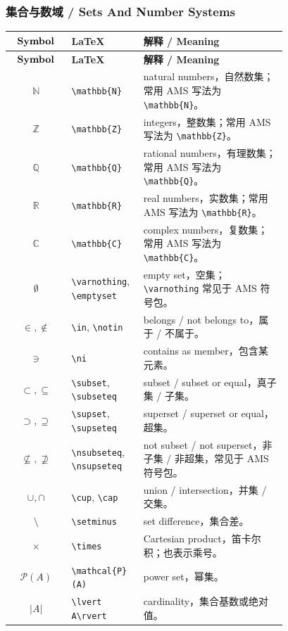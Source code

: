 \documentclass[11pt]{article}
\begin{document}
\subsubsection{集合与数域 / Sets And Number Systems}

\begin{longtable}{>{$}c<{$} p{0.26\linewidth} p{0.52\linewidth}}
\hline
\text{\textbf{Symbol}} & \textbf{LaTeX} & \textbf{解释 / Meaning} \\
\hline
\endfirsthead
\hline
\text{\textbf{Symbol}} & \textbf{LaTeX} & \textbf{解释 / Meaning} \\
\hline
\endhead
ℕ & \verb|\mathbb{N}| & natural numbers，自然数集；常用 AMS 写法为 \verb|\mathbb{N}|。 \\
ℤ & \verb|\mathbb{Z}| & integers，整数集；常用 AMS 写法为 \verb|\mathbb{Z}|。 \\
ℚ & \verb|\mathbb{Q}| & rational numbers，有理数集；常用 AMS 写法为 \verb|\mathbb{Q}|。 \\
ℝ & \verb|\mathbb{R}| & real numbers，实数集；常用 AMS 写法为 \verb|\mathbb{R}|。 \\
ℂ & \verb|\mathbb{C}| & complex numbers，复数集；常用 AMS 写法为 \verb|\mathbb{C}|。 \\
\emptyset & \verb|\varnothing|, \verb|\emptyset| & empty set，空集；\verb|\varnothing| 常见于 AMS 符号包。 \\
\in, \notin & \verb|\in|, \verb|\notin| & belongs / not belongs to，属于 / 不属于。 \\
\ni & \verb|\ni| & contains as member，包含某元素。 \\
\subset, \subseteq & \verb|\subset|, \verb|\subseteq| & subset / subset or equal，真子集 / 子集。 \\
\supset, \supseteq & \verb|\supset|, \verb|\supseteq| & superset / superset or equal，超集。 \\
⊈, ⊉ & \verb|\nsubseteq|, \verb|\nsupseteq| & not subset / not superset，非子集 / 非超集，常见于 AMS 符号包。 \\
\cup, \cap & \verb|\cup|, \verb|\cap| & union / intersection，并集 / 交集。 \\
\setminus & \verb|\setminus| & set difference，集合差。 \\
\times & \verb|\times| & Cartesian product，笛卡尔积；也表示乘号。 \\
\mathcal{P}(A) & \verb|\mathcal{P}(A)| & power set，幂集。 \\
\lvert A\rvert & \verb|\lvert A\rvert| & cardinality，集合基数或绝对值。 \\
\hline
\end{longtable}
\end{document}
